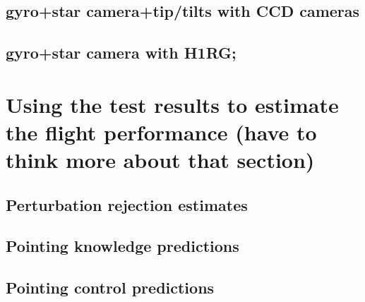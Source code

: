 \subsection{gyro+star camera+tip/tilts with CCD cameras}
\subsection{gyro+star camera with H1RG;}

\section{	Using the test results to estimate the flight performance (have to think more about that section)}
\subsection{Perturbation rejection estimates}
\subsection{Pointing knowledge predictions}
\subsection{Pointing control predictions}
